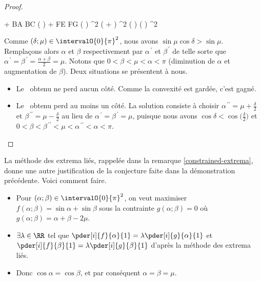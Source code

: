 \begin{proof}
	\medskip	
	\begin{stepcalc}[style=ar*]
		 + 
		 BA \cdot BC \cdot \sin \big(  \big)
		+
		 FE \cdot FG \cdot \sin \big(  \big)
	\explnext{}
		 \ell^2 ( \sin \alpha + \sin \beta )
		 \ell^2 \sin \big(  \big) \cos \big(  \big)
	\explnext{}
		 \ell^2 \sin \mu \cos \delta
	\end{stepcalc}
	
	
	\medskip
	
	Comme $(\delta ; \mu) \in \intervalO{0}{\pi}^2$,
	nous avons $\sin \mu \cos \delta > \sin \mu$.
	Remplaçons alors $\alpha$ et $\beta$ respectivement par $\alpha^{\,\prime}$ et $\beta^{\,\prime}$ de telle sorte que $\alpha^{\,\prime} = \beta^{\,\prime} = \frac{\alpha + \beta}{2} = \mu$.
	Notons que 
	$0 < \beta < \mu < \alpha < \pi$ 
	(diminution de $\alpha$ et augmentation de $\beta$).
	Deux situations se présentent à nous.
	\begin{itemize}
		\item Le \ngone\ obtenu ne perd aucun côté.
		Comme la convexité est gardée, c'est gagné.

		\item Le \ngone\ obtenu perd au moins un côté. La solution consiste à choisir
		$\alpha^{\,\prime\prime} = \mu + \frac{\delta}{2}$ et $\beta^{\,\prime\prime} = \mu - \frac{\delta}{2}$
		au lieu de
		$\alpha^{\,\prime} = \beta^{\,\prime} = \mu$, puisque nous avons
		$\cos \delta < \cos \big( \frac{\delta}{2} \big)$ et
		$0 < \beta < \beta^{\,\prime\prime} < \mu < \alpha^{\,\prime\prime} < \alpha < \pi$.
	\end{itemize}
\end{proof}




\begin{remark} 
	La méthode des extrema liés, rappelée dans la remarque \ref{constrained-extrema}, donne une autre justification de la conjecture faite dans la démonstration précédente. Voici comment faire.
	\begin{itemize}
		\item Pour $(\alpha ; \beta) \in \intervalO{0}{\pi}^2$, on veut maximiser $f(\alpha ; \beta) =  \sin \alpha + \sin \beta$ sous la contrainte $g(\alpha ; \beta) = 0$ où $g(\alpha ; \beta) = \alpha + \beta - 2 \mu$.
		
		\item
    	$\exists \lambda \in \RR$ tel que
    	$\pder[i]{f}{\alpha}{1} = \lambda \pder[i]{g}{\alpha}{1}$ et
    	$\pder[i]{f}{\beta}{1} = \lambda \pder[i]{g}{\beta}{1}$
		d'après la méthode des extrema liés.

		\item Donc
		$\cos \alpha = \cos \beta$,
		et par conséquent
		$\alpha = \beta = \mu$.
	\end{itemize}
\end{remark}


